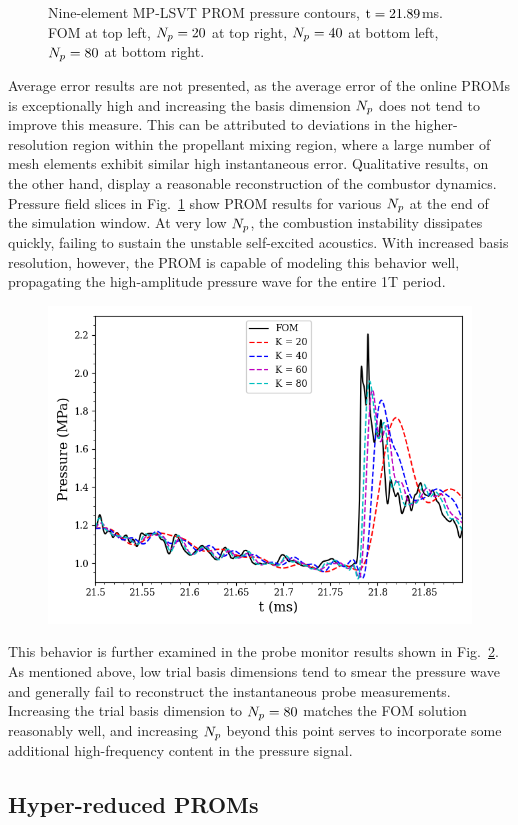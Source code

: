 \begin{figure}
\begin{minipage}{0.45\linewidth}
	\end{minipage}
	\caption{\label{fig:nineElemROMPressureContours}Nine-element MP-LSVT PROM pressure contours, $\text{t} = 21.89$ms. FOM at top left, $N_p=20$ at top right, $N_p=40$ at bottom left, $N_p=80$ at bottom right.}
\end{figure}

Average error results are not presented, as the average error of the online PROMs is exceptionally high and increasing the basis dimension $N_p$ does not tend to improve this measure. This can be attributed to deviations in the higher-resolution region within the propellant mixing region, where a large number of mesh elements exhibit similar high instantaneous error. Qualitative results, on the other hand, display a reasonable reconstruction of the combustor dynamics. Pressure field slices in Fig.~\ref{fig:nineElemROMPressureContours} show PROM results for various $N_p$ at the end of the simulation window. At very low $N_p$, the combustion instability dissipates quickly, failing to sustain the unstable self-excited acoustics. With increased basis resolution, however, the PROM is capable of modeling this behavior well, propagating the high-amplitude pressure wave for the entire 1T period.

\begin{figure}
	\centering
	\includegraphics[width=0.6\linewidth]{Chapters/HPROMResults/Images/nineElem/unsampled/point_3_Static_Pressure.png}
	\caption{\label{fig:nineElemROMProbes}}
\end{figure}

This behavior is further examined in the probe monitor results shown in Fig.~\ref{fig:nineElemROMProbes}. As mentioned above, low trial basis dimensions tend to smear the pressure wave and generally fail to reconstruct the instantaneous probe measurements. Increasing the trial basis dimension to $N_p = 80$ matches the FOM solution reasonably well, and increasing $N_p$ beyond this point serves to incorporate some additional high-frequency content in the pressure signal.

\subsection{Hyper-reduced PROMs}

